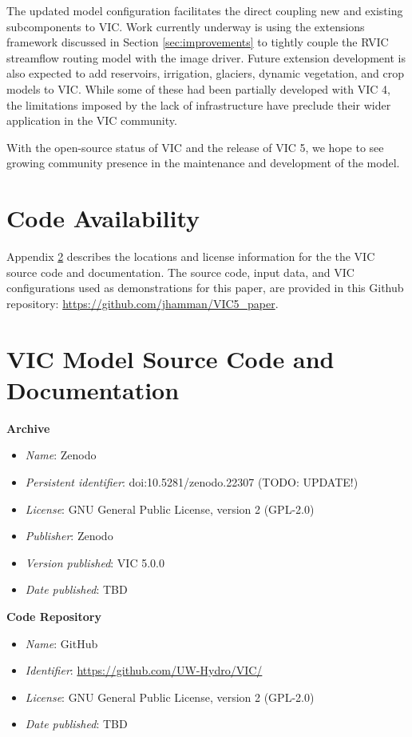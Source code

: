 \documentclass[gmd, manuscript]{copernicus}
\begin{document}
  The updated model configuration facilitates the direct coupling new and existing subcomponents to VIC.
  Work currently underway is using the extensions framework discussed in Section \ref{sec:improvements} to tightly couple the RVIC streamflow routing model with the image driver.
  Future extension development is also expected to add reservoirs, irrigation, glaciers, dynamic vegetation, and crop models to VIC.
  While some of these had been partially developed with VIC 4, the limitations imposed by the lack of infrastructure have preclude their wider application in the VIC community.

  With the open-source status of VIC and the release of VIC 5, we hope to see growing community presence in the maintenance and development of the model.

\section{Code Availability}
\label{appendix:code_avail}

  Appendix \ref{appendix:source_code} describes the locations and license information for the the VIC source code and documentation.
  The source code, input data, and VIC configurations used as demonstrations for this paper, are provided in this Github repository: \url{https://github.com/jhamman/VIC5_paper}.

\appendix
\section{VIC Model Source Code and Documentation}
\label{appendix:source_code}
{\bf Archive}

\begin{itemize}
	\item \textit{Name}: Zenodo
	\item \textit{Persistent identifier}: doi:10.5281/zenodo.22307 (TODO: UPDATE!)
	\item \textit{License}: GNU General Public License, version 2 (GPL-2.0)
	\item \textit{Publisher}:  Zenodo
	\item \textit{Version published}: VIC 5.0.0
	\item \textit{Date published}: TBD
\end{itemize}

{\bf Code Repository}

\begin{itemize}
	\item \textit{Name}: GitHub
	\item \textit{Identifier}: \url{https://github.com/UW-Hydro/VIC/}
	\item \textit{License}: GNU General Public License, version 2 (GPL-2.0)
	\item \textit{Date published}: TBD
\end{itemize}
\end{document}
